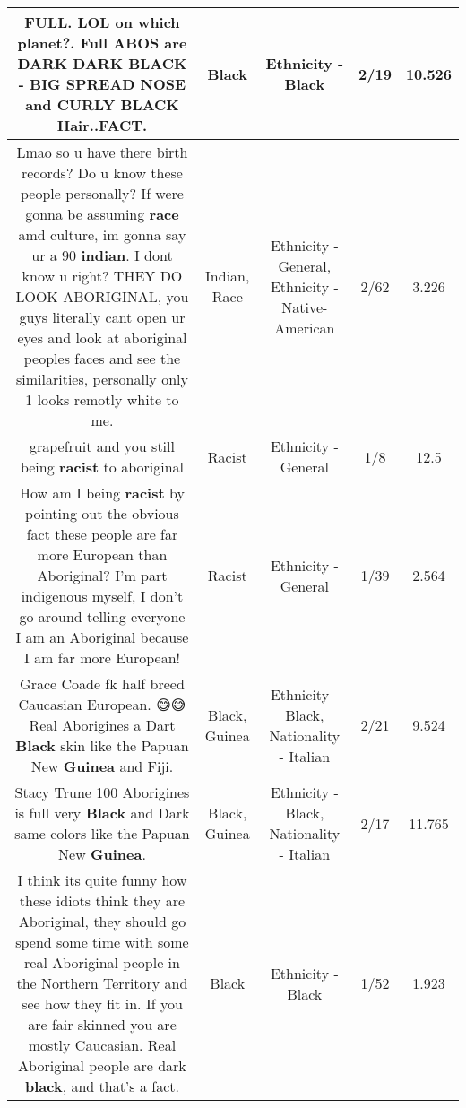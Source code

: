 \documentclass[11pt]{article}
\newlength\mylength
\begin{document}
\begin{center}
\begin{longtable}{|C{.65\mylength}|C{.30\mylength}|C{.12\mylength}|C{.12\mylength}|C{.12\mylength}|}
  \small FULL. LOL on which planet?. Full ABOS are DARK DARK \textbf{BLACK} - BIG SPREAD NOSE and CURLY \textbf{BLACK} Hair..FACT.\normalsize   & Black & Ethnicity - Black & 2/19 & 10.526 \\  \hline
  \small Lmao so u have there birth records? Do u know these people personally? If were gonna be assuming \textbf{race} amd culture, im gonna say ur a 90 \textbf{indian}. I dont know u right? THEY DO LOOK ABORIGINAL, you guys literally cant open ur eyes and look at aboriginal peoples faces and see the similarities, personally only 1 looks remotly white to me.\normalsize   & Indian, Race & Ethnicity - General, Ethnicity - Native-American & 2/62 & 3.226 \\  \hline
  \small grapefruit and you still being \textbf{racist} to aboriginal\normalsize   & Racist & Ethnicity - General & 1/8 & 12.5 \\  \hline
  \small How am I being \textbf{racist} by pointing out the obvious fact these people are far more European than Aboriginal? I'm part indigenous myself, I don't go around telling everyone I am an Aboriginal because I am far more European!\normalsize   & Racist & Ethnicity - General & 1/39 & 2.564 \\  \hline
  \small Grace Coade fk half breed Caucasian European. 😅😅 Real Aborigines a Dart \textbf{Black} skin like the Papuan New \textbf{Guinea} and Fiji.\normalsize   & Black, Guinea & Ethnicity - Black, Nationality - Italian & 2/21 & 9.524 \\  \hline
  \small Stacy Trune 100 Aborigines is full very \textbf{Black} and Dark same colors like the Papuan New \textbf{Guinea}.\normalsize   & Black, Guinea & Ethnicity - Black, Nationality - Italian & 2/17 & 11.765 \\  \hline
  \small I think its quite funny how these idiots think they are Aboriginal, they should go spend some time with some real Aboriginal people in the Northern Territory and see how they fit in.  If you are fair skinned you are mostly Caucasian.  Real Aboriginal people are dark \textbf{black}, and that's a fact.\normalsize   & Black & Ethnicity - Black & 1/52 & 1.923 \\  \hline

\end{longtable}
\end{center}
\end{document}
